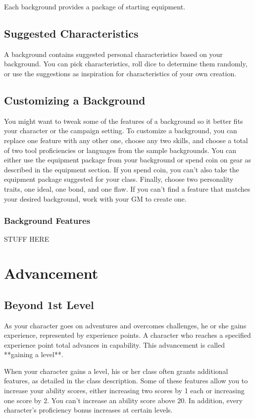 Each background provides a package of starting equipment.

\subsection{Suggested Characteristics}

A background contains suggested personal characteristics based on your background. You can pick characteristics, roll dice to determine them randomly, or use the suggestions as inspiration for characteristics of your own creation.

\subsection{Customizing a Background} 

You might want to tweak some of the features of a background so it better fits your character or the campaign setting. To customize a background, you can replace one feature with any other one, choose any two skills, and choose a total of two tool proficiencies or languages from the sample backgrounds. You can either use the equipment package from your background or spend coin on gear as described in the equipment section. If you spend coin, you can't also take the equipment package suggested for your class. Finally, choose two personality traits, one ideal, one bond, and one flaw. If you can't find a feature that matches your desired background, work with your GM to create one.

\subsubsection{Background Features} 
STUFF HERE

\section{Advancement}\label{sec:advancement}
\subsection{Beyond 1st Level}\label{subsec:beyond-first-level}

As your character goes on adventures and overcomes challenges, he or she gains experience, represented by experience points. A character who reaches a specified experience point total advances in capability. This advancement is called **gaining a level**.

When your character gains a level, his or her class often grants additional features, as detailed in the class description. Some of these features allow you to increase your ability scores, either increasing two scores by 1 each or increasing one score by 2. You can't increase an ability score above 20. In addition, every character's proficiency bonus increases at certain levels.

